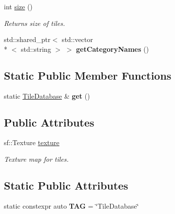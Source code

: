 \begin{DoxyCompactItemize}
\item 
\hypertarget{classTileDatabase_aa5a42ef45241805cc6ebaf33621d6d31}{int \hyperlink{classTileDatabase_aa5a42ef45241805cc6ebaf33621d6d31}{size} ()}\label{classTileDatabase_aa5a42ef45241805cc6ebaf33621d6d31}

\begin{DoxyCompactList}\small\item\em Returns size of tiles. \end{DoxyCompactList}\item 
\hypertarget{classTileDatabase_ae3a143a8bdf964e1d3481d1d94a1fb37}{std\-::shared\-\_\-ptr$<$ std\-::vector\\*
$<$ std\-::string $>$ $>$ {\bfseries get\-Category\-Names} ()}\label{classTileDatabase_ae3a143a8bdf964e1d3481d1d94a1fb37}

\end{DoxyCompactItemize}
\subsection*{Static Public Member Functions}
\begin{DoxyCompactItemize}
\item 
\hypertarget{classTileDatabase_a305f67578059fc81b04b0c99f3065e8d}{static \hyperlink{classTileDatabase}{Tile\-Database} \& {\bfseries get} ()}\label{classTileDatabase_a305f67578059fc81b04b0c99f3065e8d}

\end{DoxyCompactItemize}
\subsection*{Public Attributes}
\begin{DoxyCompactItemize}
\item 
\hypertarget{classTileDatabase_a3368141d1a148afb5830ff86b3ca29f6}{sf\-::\-Texture \hyperlink{classTileDatabase_a3368141d1a148afb5830ff86b3ca29f6}{texture}}\label{classTileDatabase_a3368141d1a148afb5830ff86b3ca29f6}

\begin{DoxyCompactList}\small\item\em Texture map for tiles. \end{DoxyCompactList}\end{DoxyCompactItemize}
\subsection*{Static Public Attributes}
\begin{DoxyCompactItemize}
\item 
\hypertarget{classTileDatabase_a69fd77e608c610f5c3f4f8e612e3526e}{static constexpr auto {\bfseries T\-A\-G} = \char`\"{}Tile\-Database\char`\"{}}\label{classTileDatabase_a69fd77e608c610f5c3f4f8e612e3526e}

\end{DoxyCompactItemize}



